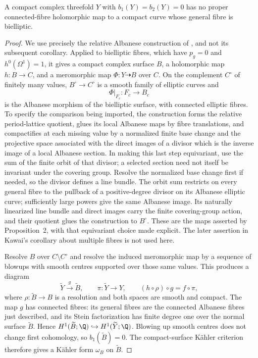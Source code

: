 \begin{proposition}
\label{st:C.3.7}
A compact complex threefold $Y$ with $b_1(Y)=b_2(Y)=0$ has no
proper connected-fibre holomorphic map to a compact curve whose
general fibre is bielliptic.
\end{proposition}
\begin{proof}
We use precisely the relative Albanese construction of
\cite[Proposition~2, pp.~605--608]{Kawai1969}, and not its subsequent
corollary. Applied to bielliptic fibres, which have
$p_g=0$ and $h^0(\Omega^1)=1$, it gives a compact complex surface
$B$, a holomorphic map $h:B\to C$, and a meromorphic map
$\Phi:Y\dashrightarrow B$ over $C$. On the complement $C^\circ$
of finitely many values, $B^\circ\to C^\circ$ is a smooth family
of elliptic curves and
\[
 \Phi|_{F_c}:F_c\longrightarrow B_c
\]
is the Albanese morphism of the bielliptic surface, with connected
elliptic fibres. To specify the comparison being imported, the
construction forms the relative period-lattice quotient, glues its
local Albanese maps by fibre translations, and compactifies at each
missing value by a normalized finite base change and the projective
space associated with the direct images of a divisor which is the
inverse image of a local Albanese section. In making this last
step equivariant, use the sum of the finite orbit of that divisor;
a selected section need not itself be invariant under the covering
group. Resolve the normalized base change first if needed, so the
divisor defines a line bundle. The orbit sum restricts on every
general fibre to the pullback of a positive-degree divisor on its
Albanese elliptic curve; sufficiently large powers give the same
Albanese image. Its naturally linearized line bundle and direct
images carry the finite covering-group action, and their quotient
glues the construction to $B^\circ$. These are the maps asserted by
Proposition~2, with that equivariant choice made explicit. The
later assertion in Kawai's corollary about multiple fibres is not
used here.

Resolve $B$ over $C\setminus C^\circ$ and resolve the induced
meromorphic map by a sequence of blowups with smooth centres
supported over those same values. This produces a diagram
\[
 \widetilde Y\xrightarrow{\ g\ }\widetilde B,
 \qquad \pi:\widetilde Y\longrightarrow Y,
 \qquad (h\circ\rho)\circ g=f\circ\pi,
\]
where $\rho:\widetilde B\to B$ is a resolution and both spaces
are smooth and compact. The map $g$ has connected fibres:
its general fibres are the connected Albanese fibres just described,
and its Stein factorization has finite degree one over the normal
surface $\widetilde B$. Hence
$H^1(\widetilde B;\Q)\hookrightarrow H^1(\widetilde Y;\Q)$.
Blowing up smooth centres does not change first cohomology, so
$b_1(\widetilde B)=0$. The compact-surface K\"ahler criterion
\cite[Theorem~1.1]{Peters1990} therefore gives a K\"ahler form
$\omega_B$ on $\widetilde B$.


\end{proof}
